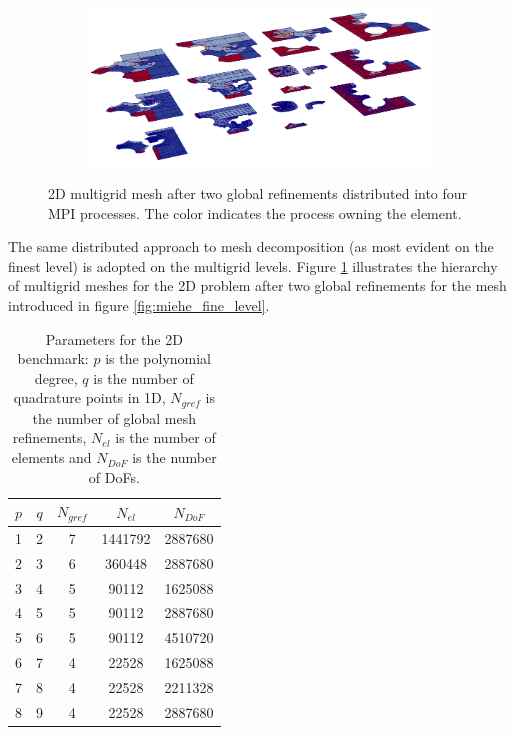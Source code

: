 \documentclass[times,doublespace]{nmeauth}
\begin{document}
%
\begin{figure}[!ht]
  \centering
  \begin{subfigure}[b]{0.8\textwidth}
    \centering
    \includegraphics[width=\textwidth]{gmg_2d_4procs.png}
  \end{subfigure}
  \caption{2D multigrid mesh after two global refinements distributed into four MPI processes. The color indicates the process owning the element.}%
  \label{fig:miehe_gmg}
\end{figure}
%
%
The same distributed approach to mesh decomposition (as most evident on the finest level) is adopted on the multigrid levels.
Figure \ref{fig:miehe_gmg} illustrates the hierarchy of multigrid meshes for the 2D problem after two global refinements for the mesh introduced in figure \ref{fig:miehe_fine_level}.
%
\begin{table}
  \centering
  \begin{tabular}{ccccc}
  \hline
    $p$ & $q$ & $N_{gref}$ & $N_{el}$ & $N_{DoF}$ \\
  \hline
    1 & 2 & 7 & 1441792 & 2887680 \\
    2 & 3 & 6 & 360448 & 2887680 \\
    3 & 4 & 5 & 90112 & 1625088 \\
    4 & 5 & 5 & 90112 & 2887680 \\
    5 & 6 & 5 & 90112 & 4510720 \\
    6 & 7 & 4 & 22528 & 1625088 \\
    7 & 8 & 4 & 22528 & 2211328 \\
    8 & 9 & 4 & 22528 & 2887680 \\
  \hline
  \end{tabular}
  \caption{Parameters for the 2D benchmark: $p$ is the polynomial degree,
  $q$ is the number of quadrature points in 1D, $N_{gref}$ is the number of global mesh refinements, $N_{el}$ is the number of elements and $N_{DoF}$ is the number of DoFs.
  }
  \label{tab:input_parameters_2d}
\end{table}
\end{document}
